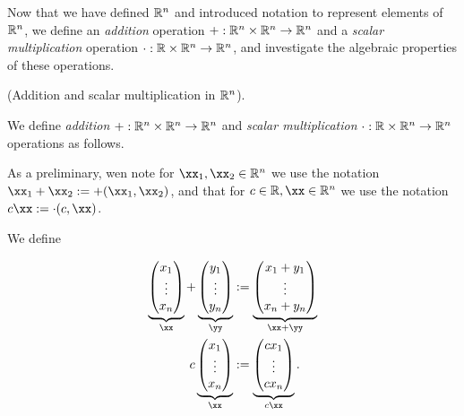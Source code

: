 Now that we have defined $\mathbb{R}^n$ and introduced notation to represent elements of $\mathbb{R}^n$, we define an \textit{addition} operation $+:\mathbb{R}^n \times \mathbb{R}^n \rightarrow \mathbb{R}^n$ and a \textit{scalar multiplication} operation $\cdot: \mathbb{R} \times \mathbb{R}^n \rightarrow \mathbb{R}^n$, and investigate the algebraic properties of these operations.

\begin{defn}
    (Addition and scalar multiplication in $\mathbb{R}^n$).
    
    We define \textit{addition} $+:\mathbb{R}^n \times \mathbb{R}^n \rightarrow \mathbb{R}^n$ and \textit{scalar multiplication} $\cdot:\mathbb{R} \times \mathbb{R}^n \rightarrow \mathbb{R}^n$ operations as follows.
    
    As a preliminary, wen note for $\xx_1, \xx_2 \in \R^n$ we use the notation $\xx_1 + \xx_2 := +(\xx_1, \xx_2)$, and that for $c \in \R, \xx \in \R^n$ we use the notation $c \xx := \cdot(c, \xx)$.
    
    We define
    
    \begin{align*}
        \underbrace
        {
            \begin{pmatrix}
                x_1 \\ \vdots \\ x_n
            \end{pmatrix}
        }_\xx
        +
        \underbrace
        {
            \begin{pmatrix}
                y_1 \\ \vdots \\ y_n
            \end{pmatrix}
        }_\yy
        &:=
        \underbrace
        {
            \begin{pmatrix}
                x_1 + y_1 \\ \vdots \\ x_n + y_n
            \end{pmatrix}
        }_{\xx + \yy}
        \\
        c
        \underbrace
        {
            \begin{pmatrix}
                x_1 \\ \vdots \\ x_n
            \end{pmatrix}
        }_\xx
        &:=
        \underbrace
        {
            \begin{pmatrix}
                c x_1 \\ \vdots \\ c x_n
            \end{pmatrix}
        }_{c \xx}.
    \end{align*}
\end{defn}

